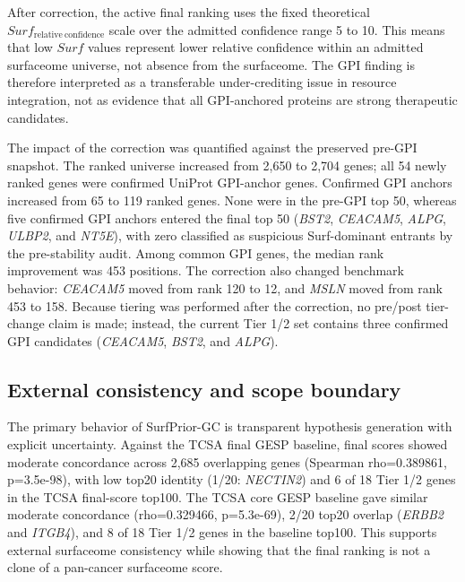 \documentclass[review,12pt,authoryear]{elsarticle}
\begin{document}
After correction, the active final ranking uses the fixed theoretical $Surf_{\mathrm{relative\ confidence}}$ scale over the admitted confidence range 5 to 10. This means that low $Surf$ values represent lower relative confidence within an admitted surfaceome universe, not absence from the surfaceome. The GPI finding is therefore interpreted as a transferable under-crediting issue in resource integration, not as evidence that all GPI-anchored proteins are strong therapeutic candidates.

The impact of the correction was quantified against the preserved pre-GPI snapshot. The ranked universe increased from 2,650 to 2,704 genes;\allowbreak{} all 54 newly ranked genes were confirmed UniProt GPI-anchor genes. Confirmed GPI anchors increased from 65 to 119 ranked genes. None were in the pre-GPI top 50, whereas five confirmed GPI anchors entered the final top 50 (\textit{BST2}, \textit{CEACAM5}, \textit{ALPG}, \textit{ULBP2}, and \textit{NT5E}), with zero classified as suspicious Surf-dominant entrants by the pre-stability audit. Among common GPI genes, the median rank improvement was 453 positions. The correction also changed benchmark behavior: \textit{CEACAM5} moved from rank 120 to 12, and \textit{MSLN} moved from rank 453 to 158. Because tiering was performed after the correction, no pre/\allowbreak{}post tier-change claim is made;\allowbreak{} instead, the current Tier 1/\allowbreak{}2 set contains three confirmed GPI candidates (\textit{CEACAM5}, \textit{BST2}, and \textit{ALPG}).

\subsection{External consistency and scope boundary}

The primary behavior of SurfPrior-GC is transparent hypothesis generation with explicit uncertainty. Against the TCSA final GESP baseline, final scores showed moderate concordance across 2,685 overlapping genes (Spearman rho=0.389861, p=3.5e-98), with low top20 identity (1/\allowbreak{}20: \textit{NECTIN2}) and 6 of 18 Tier 1/\allowbreak{}2 genes in the TCSA final-score top100. The TCSA core GESP baseline gave similar moderate concordance (rho=0.329466, p=5.3e-69), 2/\allowbreak{}20 top20 overlap (\textit{ERBB2} and \textit{ITGB4}), and 8 of 18 Tier 1/\allowbreak{}2 genes in the baseline top100. This supports external surfaceome consistency while showing that the final ranking is not a clone of a pan-cancer surfaceome score.
\end{document}
